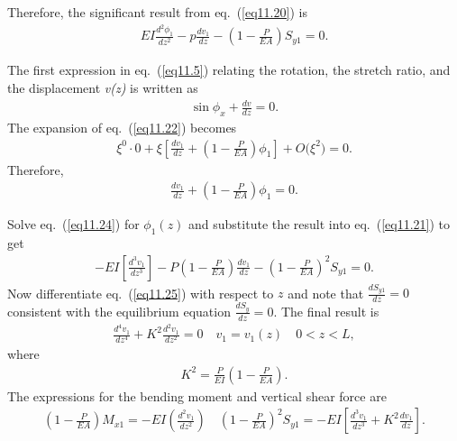 \documentclass{AeroStructure-ERJohnson}
\begin{document}
\noindent Therefore, the significant result from eq.~(\ref{eq11.20}) is
\begin{align}
E I \frac{d^{2} \phi_{1}}{d z^{2}}-p \frac{d v_{1}}{d z}-\left(1-\frac{P}{E A}\right) S_{y 1}=0. \label{eq11.21}
\end{align}

\vspace*{-1pc}

The first expression in eq.~(\ref{eq11.5}) relating the rotation, the stretch ratio, and the displacement \textit{v(z)} is written as
\begin{align}
 [1-P /(E A)] \sin \phi_{x}+\frac{d v}{d z}=0. \label{eq11.22}
\end{align}
The expansion of eq.~(\ref{eq11.22}) becomes
\begin{align}
\xi^{0} \cdot 0+\xi\left[\frac{d v_{1}}{d z}+\left(1-\frac{P}{E A}\right) \phi_{1}\right]+O\big(\xi^{2}\big)=0. \label{eq11.23}
\end{align}
Therefore,
\begin{align}
\frac{d v_{1}}{d z}+\left(1-\frac{P}{E A}\right) \phi_{1}=0. \label{eq11.24}
\end{align}

\vspace*{-1pc}

Solve eq.~(\ref{eq11.24}) for $ \phi_{1}(z)$ and substitute the result into eq.~(\ref{eq11.21}) to get
\begin{align}
-E I\left[\frac{d^{3} v_{1}}{dz^{3}}\right]-P\left(1-\frac{P}{E A}\right) \frac{d v_{1}}{d z}-\left(1-\frac{P}{E A}\right)^{2} S_{y 1}=0. \label{eq11.25}
\end{align}
Now differentiate eq.~(\ref{eq11.25}) with respect to $z$ and note that $ \frac{d S_{y 1}}{d z}=0 $ consistent with the equilibrium equation $ \frac{d S_{y}}{d z}=0 $. The final result is
\begin{align}
\frac{d^{4} v_{1}}{d z^{4}}+K^{2} \frac{d^{2} v_{1}}{d z^{2}}=0 \quad v_{1}=v_{1}(z) \quad 0<z<L , \label{eq11.26}
\end{align}
where
\begin{align}
K^{2}=\frac{P}{E I}\left(1-\frac{P}{E A}\right). \label{eq11.27}
\end{align}
The expressions for the bending moment and vertical shear force are
\begin{align}
\left(1-\frac{P}{E A}\right) M_{x 1}=-E I\left(\frac{d^{2} v_{1}}{d z^{2}}\right) \quad\left(1-\frac{P}{E A}\right)^{2} S_{y 1}=-E I\left[\frac{d^{3} v_{1}}{dz^{3}}+K^{2} \frac{d v_{1}}{d z}\right]. \label{eq11.28}
\end{align}
\end{document}
